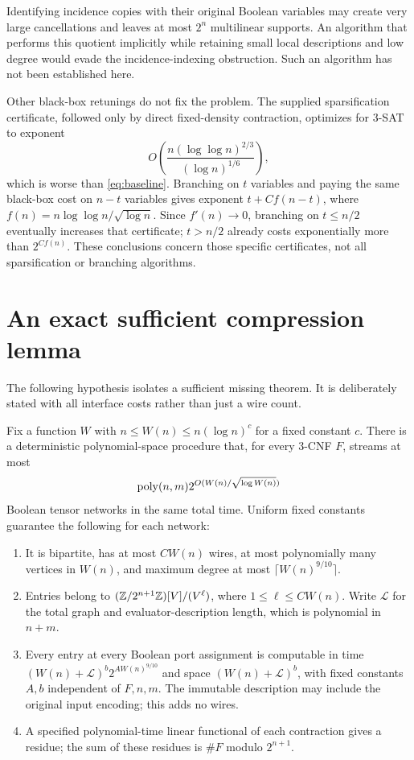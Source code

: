 Identifying incidence copies with their original Boolean variables may create very large cancellations and leaves at most $2^n$ multilinear supports. An algorithm that performs this quotient implicitly while retaining small local descriptions and low degree would evade the incidence-indexing obstruction. Such an algorithm has not been established here.

Other black-box retunings do not fix the problem. The supplied sparsification certificate, followed only by direct fixed-density contraction, optimizes for 3-SAT to exponent
\[
 O\!\left(\frac{n(\log\log n)^{2/3}}{(\log n)^{1/6}}\right),
\]
which is worse than \eqref{eq:baseline}. Branching on $t$ variables and paying the same black-box cost on $n-t$ variables gives exponent $t+Cf(n-t)$, where $f(n)=n\log\log n/\sqrt{\log n}$. Since $f'(n)\to0$, branching on $t\le n/2$ eventually increases that certificate; $t>n/2$ already costs exponentially more than $2^{Cf(n)}$. These conclusions concern those specific certificates, not all sparsification or branching algorithms.



\section{An exact sufficient compression lemma}\label{sec:conditional}
The following hypothesis isolates a sufficient missing theorem. It is deliberately stated with all interface costs rather than just a wire count.

\begin{hypothesis}\label{hyp:compression}
Fix a function $W$ with $n\le W(n)\le n(\log n)^c$ for a fixed constant $c$. There is a deterministic polynomial-space procedure that, for every 3-CNF $F$, streams at most
\[
 \operatorname{poly}(n,m)2^{O(W(n)/\sqrt{\log W(n)})}
\]
Boolean tensor networks in the same total time. Uniform fixed constants guarantee the following for each network:
\begin{enumerate}
\item It is bipartite, has at most $CW(n)$ wires, at most polynomially many vertices in $W(n)$, and maximum degree at most $\lceil W(n)^{9/10}\rceil$.
\item Entries belong to $(\mathbb Z/2^{n+1}\mathbb Z)[V]/(V^\ell)$, where $1\le\ell\le CW(n)$. Write $\mathcal L$ for the total graph and evaluator-description length, which is polynomial in $n+m$.
\item Every entry at every Boolean port assignment is computable in time $(W(n)+\mathcal L)^b2^{AW(n)^{9/10}}$ and space $(W(n)+\mathcal L)^b$, with fixed constants $A,b$ independent of $F,n,m$. The immutable description may include the original input encoding; this adds no wires.
\item A specified polynomial-time linear functional of each contraction gives a residue; the sum of these residues is $\#F$ modulo $2^{n+1}$.
\end{enumerate}
\end{hypothesis}

